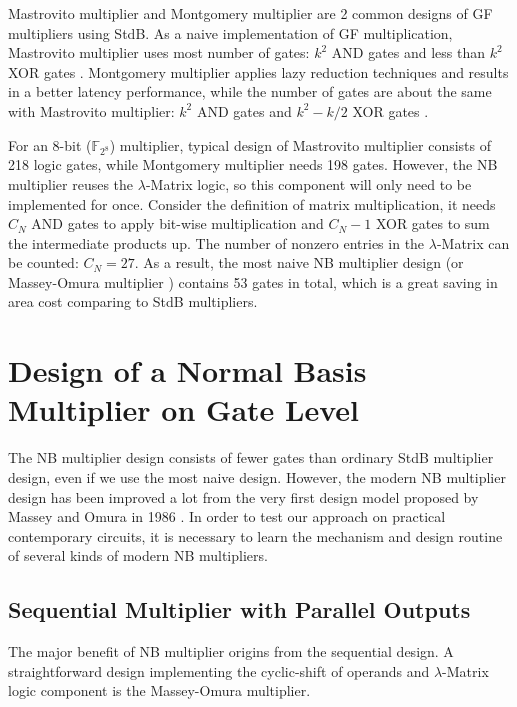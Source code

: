 
Mastrovito multiplier \cite{mastro:1989} and Montgomery multiplier \cite{PT:1985} are 2 common designs
of GF multipliers using StdB. As a naive implementation of GF multiplication,
Mastrovito multiplier uses most number of gates:
$k^2$ AND gates and less than $k^2$ XOR gates \cite{Mastrovito}. Montgomery multiplier 
applies lazy reduction techniques and results in a better latency performance, while the number of gates are about
the same with Mastrovito multiplier:
$k^2$ AND gates and $k^2-k/2$ XOR gates \cite{wu:2002}. 

For an 8-bit ($\mathbb F_{2^8}$) multiplier, typical design of Mastrovito multiplier consists of 218 logic gates, while 
Montgomery multiplier needs 198 gates. However, the NB multiplier reuses the $\lambda$-Matrix 
logic, so this component will only need to be implemented for once. 
Consider the definition of matrix multiplication, it needs $C_N$ AND gates to apply 
bit-wise multiplication and $C_N-1$ XOR gates to sum the intermediate products up. The number of nonzero entries
in the $\lambda$-Matrix can be counted: $C_N = 27$.
As a result, the most naive NB multiplier design (or Massey-Omura multiplier \cite{MasseyOmura})
contains 53 gates in total, which is a great saving in area cost comparing to StdB multipliers.

\section{Design of a Normal Basis Multiplier on Gate Level}
\label{sec:nbdesign}
The NB multiplier design consists of fewer gates than ordinary StdB multiplier design, even if 
we use the most naive design. However, the modern NB multiplier design has been improved a lot from the 
very first design model proposed by Massey and Omura in 1986 \cite{MasseyOmura}. In order to 
test our approach on practical contemporary circuits, it is necessary to learn the mechanism and design 
routine of several kinds of modern NB multipliers.
\subsection{Sequential Multiplier with Parallel Outputs}
The major benefit of NB multiplier origins from the sequential design. A straightforward design implementing 
the cyclic-shift of operands and $\lambda$-Matrix logic component is the Massey-Omura multiplier.

